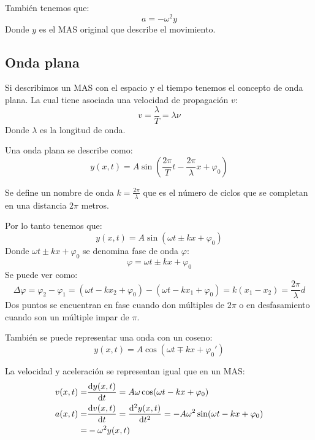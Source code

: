 \documentclass[arial,a4paper,print]{article}
\begin{document}
También tenemos que:
\begin{equation*}
	a = -\omega^{2}y
\end{equation*}
Donde $y$ es el MAS original que describe el movimiento. 

\subsection{Onda plana}
Si describimos un MAS con el espacio y el tiempo tenemos el concepto de onda plana. La cual tiene asociada una velocidad de propagación $v$:
\begin{equation*}
	v=\frac{\lambda}{T} = \lambda\nu
\end{equation*}
Donde $\lambda$ es la longitud de onda. 

Una onda plana se describe como:
\begin{equation*}
	y(x,t) = A \sin\left(\frac{2\pi}{T}t - \frac{2\pi}{\lambda}x + \varphi_{0}\right)
\end{equation*}

Se define un nombre de onda $k=\frac{2\pi}{\lambda}$ que es el número de ciclos que se completan en una distancia $2\pi$ metros.

Por lo tanto tenemos que:
\begin{equation*}
	y(x,t) = A \sin\left(\omega t \pm kx + \varphi_{0}\right)
\end{equation*}
Donde $\omega t \pm kx + \varphi_{0}$ se denomina fase de onda $\varphi$:
\begin{equation*}
	\varphi = \omega t \pm kx + \varphi_{0}
\end{equation*} 
Se puede ver como:
\begin{equation*}
	\Delta\varphi = \varphi_2 - \varphi_1 = (\omega t - kx_{2} + \varphi_{0}) - (\omega t - kx_{1} + \varphi_{0}) = k(x_{1} - x_{2}) = \frac{2\pi}{\lambda}d
\end{equation*}
Dos puntos se encuentran en fase cuando don múltiples de $2\pi$ o en desfasamiento cuando son un múltiple impar de $\pi$.

También se puede representar una onda con un coseno:
\begin{equation*}
	y(x,t) = A \cos\left(\omega t \mp kx + \varphi_{0}'\right)
\end{equation*}

La velocidad y aceleración se representan igual que en un MAS:
\begin{align*}
	 v(x,t) =& \dv{y(x,t)}{t} = A\omega\cos(\omega t - kx + \varphi_{0}) \\
	 a(x,t) =& \dv{v(x,t)}{t} = \dv[2]{y(x,t)}{t} = -A\omega^{2}\sin(\omega t - kx + \varphi_{0})\\
	  =& -\omega^{2}y(x,t)
\end{align*}
\end{document}
